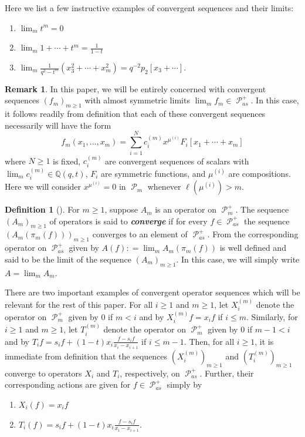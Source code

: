 \documentclass[11pt]{article}
\theoremstyle{definition}
\newtheorem{defi}[theo]{Definition}
\newtheorem{rema}[theo]{Remark}
\numberwithin{equation}{section}
\DeclareMathOperator{\sP}{\mathscr{P} }
\begin{document}
Here we list a few instructive examples of convergent sequences and their limits:

\begin{enumerate}
    \item $\lim_{m} t^m = 0$
    \item $\lim_{m} 1+\cdots +t^m = \frac{1}{1-t}$
    \item $\lim_{m} \frac{1}{q^2-t^m}(x_3^2 +\cdots+ x_{m}^2 ) = q^{-2} p_2[x_3+ \cdots].$
\end{enumerate}

\begin{rema}\label{useful defn of convergence}
    In this paper, we will be entirely concerned with convergent sequences $(f_m)_{m \geq 1}$ with almost symmetric limits $\lim_{m} f_m \in \sP_{as}^{+}$. In this case, it follows readily from definition that each of these convergent sequences necessarily will have the form 
    $$f_m(x_1,\ldots,x_m) = \sum_{i=1}^{N} c_i^{(m)}x^{\mu^{(i)}}F_i[x_1+\cdots + x_m]$$
    where $N \geq 1$ is fixed, $c_i^{(m)}$ are convergent sequences of scalars with $\lim_{m} c_i^{(m)} \in \mathbb{Q}(q,t)$, $F_i$ are symmetric functions, and $\mu^{(i)}$ are compositions. Here we will consider $x^{\mu^{(i)}} = 0$ in $\sP_{m}$ whenever $\ell(\mu^{(i)}) > m$.
\end{rema}

\begin{defi}[\cite{Ion_2022}]
    For $m \geq 1$, suppose $A_m$ is an operator on $\sP_m^{+}$. The sequence $(A_m)_{m \geq 1}$ of operators is said to \textbf{\textit{converge}} if for every $f \in \sP_{as}^{+}$ the sequence $(A_m(\pi_m(f)))_{m \geq 1}$ converges to an element of $\sP_{as}^{+}$. From \cite{Ion_2022} the corresponding operator on $\sP_{as}^{+}$ given by $A(f): = \lim_{m} A_m(\pi_m(f))$ is well defined and said to be the limit of the sequence $(A_m)_{m \geq 1}$. In this case, we will simply write $A = \lim_{m} A_m$.
\end{defi}

There are two important examples of convergent operator sequences which will be relevant for the rest of this paper. For all $i 
\geq 1$ and $m \geq 1$, let $X_i^{(m)}$ denote the operator on $\sP_m^{+}$ given by $0$ if $m < i$ and by $X_i^{(m)}f = x_i f$ if $i \leq m$. Similarly, for $i \geq 1$ and $m \geq 1$, let $T_i^{(m)}$ denote the operator on $\sP_m^{+}$ given by $0$ if $m-1 < i$ and by $T_if = s_if + (1-t)x_i \frac{f-s_if}{x_i-x_{i+1}}$ if $i \leq m-1$. Then, for all $i \geq 1$, it is immediate from definition that the sequences $(X_i^{(m)})_{m \geq 1}$ and $(T_i^{(m)})_{m \geq 1}$ converge to operators $X_i$ and $T_i$, respectively, on $\sP_{as}^{+}$. Further, their corresponding actions are given for $f \in \sP_{as}^{+}$ simply by 
\begin{enumerate}
    \item $X_i(f) = x_if$
    \item $T_i(f) = s_if + (1-t)x_i \frac{f-s_if}{x_i-x_{i+1}}.$ 
\end{enumerate}
\end{document}
